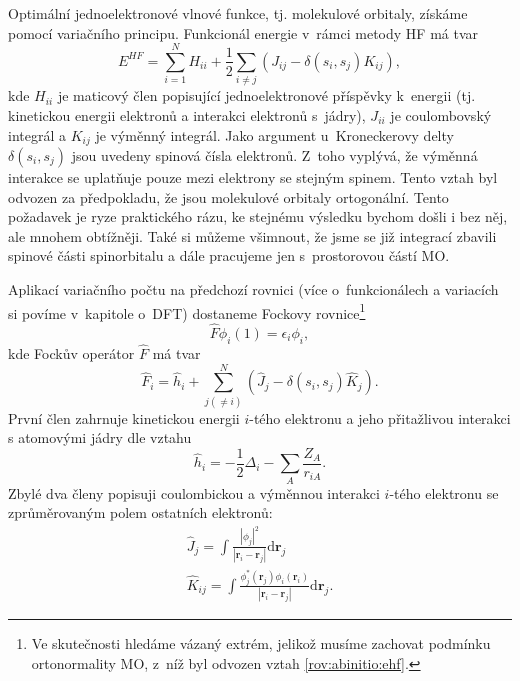 Optimální jednoelektronové vlnové funkce, tj. molekulové orbitaly, získáme pomocí variačního principu. Funkcionál energie v~rámci metody HF má tvar 
\begin{equation}
E^{HF}= \sum_{i=1}^N H_{ii}+ \frac{1}{2}\sum_{i\neq j} \left( J_{ij}-\delta(s_{i},s_{j})K_{ij} \right),
\label{rov:abinitio:ehf}
\end{equation}
kde $H_{ii}$ je maticový člen popisující jednoelektronové příspěvky k~energii (tj. kinetickou energii elektronů a interakci elektronů s~jádry), $J_{ii}$ je coulombovský integrál a $K_{ij}$ je výměnný integrál.
Jako argument u~Kroneckerovy delty $\delta(s_{i},s_{j})$ jsou uvedeny spinová čísla elektronů. Z~toho vyplývá, že výměnná interakce se uplatňuje pouze mezi elektrony se stejným spinem.
Tento vztah byl odvozen za předpokladu, že jsou molekulové orbitaly ortogonální. Tento požadavek je ryze praktického rázu, ke stejnému výsledku bychom došli i bez něj, ale mnohem obtížněji. Také si můžeme všimnout, že jsme se již integrací zbavili spinové části spinorbitalu a dále pracujeme jen s~prostorovou částí MO.

Aplikací variačního počtu na předchozí rovnici (více o~funkcionálech a variacích si povíme v~kapitole o~DFT) dostaneme Fockovy rovnice\footnote{Ve skutečnosti hledáme vázaný extrém, jelikož musíme zachovat podmínku ortonormality MO, z~níž byl odvozen vztah \ref{rov:abinitio:ehf}.} 
\begin{equation}
\hat{F}\phi_i(1) = \epsilon_i \phi_i ,
\label{rov:abinitio:fockrov}  
\end{equation}
kde Fockův operátor $\hat{F}$ má tvar
\begin{equation}
\hat{F}_i = \hat{h}_i+\sum^N_{j(\neq i)} \left(\hat{J}_j - \delta(s_i,s_j) \hat{K}_j \right) .
\label{rov:abinitio:fockoper}
\end{equation}
První člen zahrnuje  kinetickou energii $i$-tého elektronu a jeho přitažlivou interakci s atomovými jádry dle vztahu
\begin{equation}
\hat{h}_i = -\frac{1}{2}\Delta_i - \sum_{A}\frac{Z_A}{r_{iA}} .
\end{equation}
Zbylé dva členy popisuji coulombickou a výměnnou interakci $i$-tého elektronu se zprůměrovaným polem ostatních elektronů:
\begin{eqnarray}
\hat{J}_j=\int \frac{|\phi_j |^2}{|\textbf{r}_{i}-\textbf{r}_{j}|}\mathrm{d}\textbf{r}_j \\
\hat{K}_{ij} = \int \frac{\phi_j^*(\mathbf{r}_j)\phi_i(\mathbf{r}_i)}{|\textbf{r}_{i}-\textbf{r}_{j}|}\mathrm{d}\textbf{r}_j .
\end{eqnarray}

